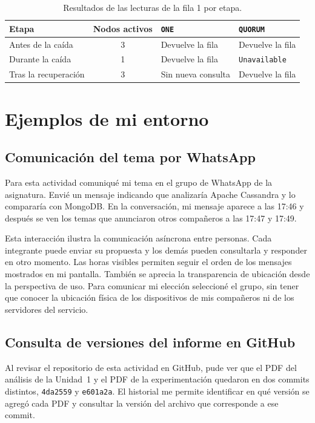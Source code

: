 \documentclass[11pt,a4paper]{article}
\begin{document}
\begin{table}[H]
  \centering
  \caption{Resultados de las lecturas de la fila 1 por etapa.}
  \label{tab:exp-cassandra}
  \begin{tabular}{@{}lcll@{}}
    \toprule
    Etapa & Nodos activos & \texttt{ONE} & \texttt{QUORUM} \\
    \midrule
    Antes de la caída & 3 & Devuelve la fila & Devuelve la fila \\
    Durante la caída & 1 & Devuelve la fila & \texttt{Unavailable} \\
    Tras la recuperación & 3 & Sin nueva consulta & Devuelve la fila \\
    \bottomrule
  \end{tabular}
\end{table}

\section{Ejemplos de mi entorno}

\subsection{Comunicación del tema por WhatsApp}
Para esta actividad comuniqué mi tema en el grupo de WhatsApp de la asignatura. Envié un mensaje indicando que analizaría Apache Cassandra y lo compararía con MongoDB. En la conversación, mi mensaje aparece a las 17:46 y después se ven los temas que anunciaron otros compañeros a las 17:47 y 17:49.

Esta interacción ilustra la comunicación asíncrona entre personas. Cada integrante puede enviar su propuesta y los demás pueden consultarla y responder en otro momento. Las horas visibles permiten seguir el orden de los mensajes mostrados en mi pantalla. También se aprecia la transparencia de ubicación desde la perspectiva de uso. Para comunicar mi elección seleccioné el grupo, sin tener que conocer la ubicación física de los dispositivos de mis compañeros ni de los servidores del servicio.

\subsection{Consulta de versiones del informe en GitHub}
Al revisar el repositorio de esta actividad en GitHub, pude ver que el PDF del análisis de la Unidad~1 y el PDF de la experimentación quedaron en dos commits distintos, \texttt{4da2559} y \texttt{e601a2a}. El historial me permite identificar en qué versión se agregó cada PDF y consultar la versión del archivo que corresponde a ese commit.
\end{document}
